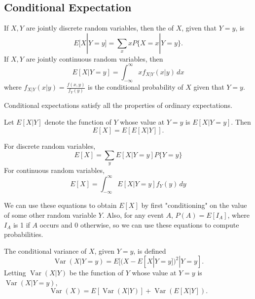 \documentclass{article}
\DeclareMathOperator{\Var}{\textrm{Var}}
\begin{document}
\subsection{Conditional Expectation}
\begin{definition}    
    \begin{itemize}
        \ii If $X,Y$ are jointly discrete random variables, then the  of $X$, given that $Y=y$, is 
        \[E[X|Y=y]=\sum_{x}xP\{X=x|Y=y\}.\]
        \ii If $X,Y$ are jointly continuous random variables, then 
        \[E[X|Y=y]=\int_{-\infty}^{\infty}xf_{X|Y}(x|y)\,dx\]where $f_{X|Y}(x|y)=\frac{f(x,y)}{f_{Y}(y)}$ is the conditional probability of $X$ given that $Y=y$. 
    \end{itemize}
\end{definition}
\begin{remark}
    Conditional expectations satisfy all the properties of ordinary expectations.
\end{remark}
\begin{theorem}
    Let $E[X|Y]$ denote the function of $Y$ whose value at $Y=y$ is $E[X|Y=y]$. Then 
    \[E[X]=E[E[X|Y]].\]
    \begin{enumerate}
        \ii For discrete random variables, 
        \[E[X]=\sum_{y}E[X|Y=y]P\{Y=y\}\]
        \ii For continuous random variables,
        \[E[X]=\int_{-\infty}^{\infty}E[X|Y=y]f_{Y}(y)\,dy\]
    \end{enumerate}
    We can use these equations to obtain $E[X]$ by first "conditioning" on the value of some other random variable $Y$. Also, for any event $A$, $P(A)=E[I_{A}]$, where $I_{A}$ is 1 if $A$ occurs and $0$ otherwise, so we can use these equations to compute probabilities.
\end{theorem}
\begin{definition}
    The conditional variance of $X$, given $Y=y$, is defined 
    \[\Var(X|Y=y)=E[(X-E[X|Y=y])^{2}|Y=y].\]
    Letting $\Var(X|Y)$ be the function of $Y$ whose value at $Y=y$ is $\Var(X|Y=y),$
    \[\Var(X)=E[\Var(X|Y)]+\Var(E[X|Y]).\]
\end{definition}
\end{document}
